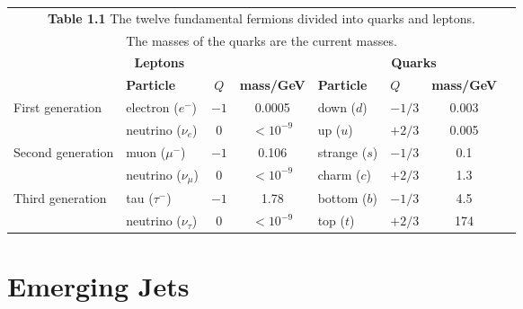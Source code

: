 
\begin{table}[h] %
	\centering
	\renewcommand{\arraystretch}{1.3}
	\setlength{\tabcolsep}{10pt}
	\begin{tabular}{l l c c | l l c c}
		\multicolumn{8}{c}{\textbf{Table 1.1} The twelve fundamental fermions divided into quarks and leptons.}                                                \\
		\multicolumn{8}{c}{The masses of the quarks are the current masses.}                                                                                   \\
		\toprule
		\multicolumn{4}{c}{\textbf{Leptons}} & \multicolumn{4}{c}{\textbf{Quarks}}                                                                             \\
		\midrule
		\textbf{}                            & \textbf{Particle}                   & $Q$  & \textbf{mass/GeV} & \textbf{Particle} & $Q$    & \textbf{mass/GeV} \\
		\midrule
		First generation                     & electron ($e^-$)                    & $-1$ & 0.0005            & down ($d$)        & $-1/3$ & 0.003             \\
		                                     & neutrino ($\nu_e$)                  & 0    & $<10^{-9}$        & up ($u$)          & $+2/3$ & 0.005             \\
		\midrule
		Second generation                    & muon ($\mu^-$)                      & $-1$ & 0.106             & strange ($s$)     & $-1/3$ & 0.1               \\
		                                     & neutrino ($\nu_\mu$)                & 0    & $<10^{-9}$        & charm ($c$)       & $+2/3$ & 1.3               \\
		\midrule
		Third generation                     & tau ($\tau^-$)                      & $-1$ & 1.78              & bottom ($b$)      & $-1/3$ & 4.5               \\
		                                     & neutrino ($\nu_\tau$)               & 0    & $<10^{-9}$        & top ($t$)         & $+2/3$ & 174               \\
		\bottomrule
	\end{tabular}
	\label{SM_particles}
\end{table}


\section{Emerging Jets}

